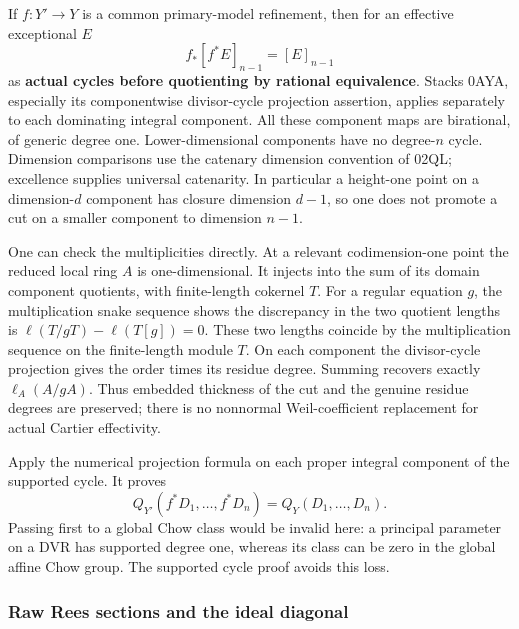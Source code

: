 \documentclass[
]{article}
\begin{document}
If \(f:Y'\to Y\) is a common primary-model refinement, then for an
effective exceptional \(E\) \[f_*[f^*E]_{n-1}=[E]_{n-1}\] as
\textbf{actual cycles before quotienting by rational equivalence}.
Stacks 0AYA, especially its componentwise divisor-cycle projection
assertion, applies separately to each dominating integral component. All
these component maps are birational, of generic degree one.
Lower-dimensional components have no degree-\(n\) cycle. Dimension
comparisons use the catenary dimension convention of 02QL; excellence
supplies universal catenarity. In particular a height-one point on a
dimension-\(d\) component has closure dimension \(d-1\), so one does not
promote a cut on a smaller component to dimension \(n-1\).

One can check the multiplicities directly. At a relevant codimension-one
point the reduced local ring \(A\) is one-dimensional. It injects into
the sum of its domain component quotients, with finite-length cokernel
\(T\). For a regular equation \(g\), the multiplication snake sequence
shows the discrepancy in the two quotient lengths is
\(\ell(T/gT)-\ell(T[g])=0\). These two lengths coincide by the
multiplication sequence on the finite-length module \(T\). On each
component the divisor-cycle projection gives the order times its residue
degree. Summing recovers exactly \(\ell_A(A/gA)\). Thus embedded
thickness of the cut and the genuine residue degrees are preserved;
there is no nonnormal Weil-coefficient replacement for actual Cartier
effectivity.

Apply the numerical projection formula on each proper integral component
of the supported cycle. It proves
\[Q_{Y'}(f^*D_1,\ldots,f^*D_n)=Q_Y(D_1,\ldots,D_n).\] Passing first to a
global Chow class would be invalid here: a principal parameter on a DVR
has supported degree one, whereas its class can be zero in the global
affine Chow group. The supported cycle proof avoids this loss.

\subsubsection{Raw Rees sections and the ideal
diagonal}\label{raw-rees-sections-and-the-ideal-diagonal}
\end{document}
